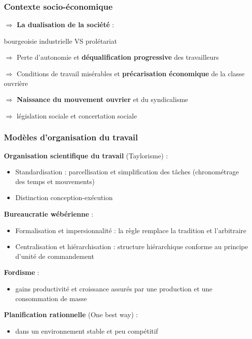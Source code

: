 \documentclass[12pt]{beamer}
\begin{document}
  \begin{frame}
    \frametitle{Contexte socio-économique}
    
    $\Rightarrow$ \textbf{La dualisation de la société} :
    \begin{center} bourgeoisie industrielle VS prolétariat \end{center}
    
    $\Rightarrow$ Perte d'autonomie et \textbf{déqualification progressive} des travailleurs
    
    $\Rightarrow$ Conditions de travail misérables et \textbf{précarisation économique} de la classe ouvrière
    
    $\Rightarrow$ \textbf{Naissance du mouvement ouvrier} et du syndicalisme
    \begin{center} $\Rightarrow$ législation sociale et concertation sociale \end{center}
    
  \end{frame}
  
  \begin{frame}
      \frametitle{Modèles d'organisation du travail}
      
      \textbf{Organisation scientifique du travail} (Taylorisme) :
      
      \begin{itemize}
       \item Standardisation : parcellisation et simplification des tâches (chronométrage des temps et mouvements)
       \item Distinction conception-exécution
      \end{itemize}
      
      \textbf{Bureaucratie wébérienne} :
      
      \begin{itemize}
       \item Formalisation et impersionnalité : la règle remplace la tradition et l'arbitraire
       \item Centralisation et hiérarchisation : structure hiérarchique conforme au principe d'unité de commandement
      \end{itemize}
      
      \textbf{Fordisme} :
      
      \begin{itemize} \item gains productivité et croissance assurés par une production et une consommation de masse \end{itemize}
      
      \textbf{Planification rationnelle} (One best way) :
      
      \begin{itemize} \item dans un environnement stable et peu compétitif \end{itemize}
      
  \end{frame}
  
\end{document}
